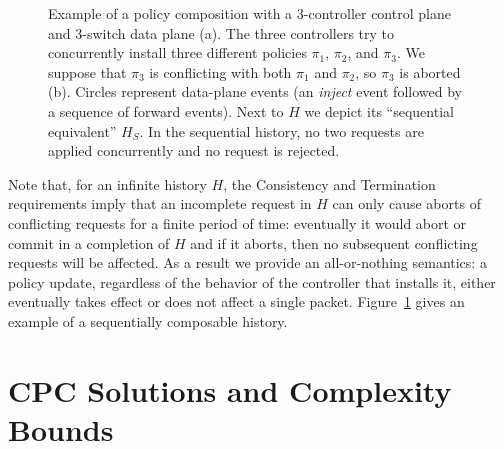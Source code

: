\documentclass[11pt,pdftex,letter]{article}
\begin{document}
\begin{figure}[t]
\centering
{}
\vspace{-1.0em}
\caption{\small Example of a policy composition with a $3$-controller control
  plane and $3$-switch data plane (a).
The three controllers try to
concurrently install three different policies $\pi_1$, $\pi_2$, and
$\pi_3$. We suppose that  $\pi_3$ is conflicting with both
$\pi_1$ and $\pi_2$, so $\pi_3$ is aborted (b).
Circles represent data-plane events (an \emph{inject} event followed
by a sequence of forward events).
Next to $H$ we depict its ``sequential equivalent''
$H_S$. In the sequential history, no two requests
are applied concurrently and no request is rejected.}
\label{fig:examples}
\vspace{-1.0em}
\end{figure}

Note that, for an infinite history $H$, the Consistency and Termination
requirements imply that an incomplete request in $H$ can only cause
aborts of conflicting requests for a finite period of time: eventually it
would abort or commit in a completion of $H$ and if it aborts, then no
subsequent conflicting requests will be affected.
As a result we provide an all-or-nothing semantics:
a policy update, regardless of the behavior of the controller that
installs it,  either eventually takes effect or does not affect a single packet.
%
Figure~\ref{fig:examples} gives an example of a sequentially
composable history.


\section{CPC Solutions and Complexity Bounds}\label{sec:solution}
\end{document}
